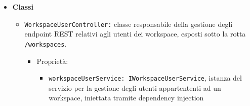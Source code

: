 \documentclass[a4paper, 11pt]{article}
\begin{document}
\begin{itemize}
\begin{itemize}
        \item \texttt{IUserRoleReader:} interfaccia che espone la lettura del ruolo di un utente rispetto a una repository.
        \begin{itemize}
            \item \texttt{getUserRoleForRepository(repositoryId: string, userId: string):\\ WorkspaceRole}
        \end{itemize}
        \item \texttt{IWorkspaceUserRepository:} interfaccia che definisce le operazioni di accesso ai dati per la gestione degli utenti nei workspace.
        \begin{itemize}
            \item \texttt{addUserToWorkspace(user: UserOfWorkspaceEntity, workspaceId: string): void} 
            \item \texttt{removeUserFromWorkspace(workspaceId: string, userId: string): void} 
            \item \texttt{getUsersOfWorkspace(workspaceId: string): UserOfWorkspaceEntity[]} 
            \item \texttt{checkIfUserIsInWorkspace(workspaceId: string, userId: string): boolean} 
            \item \texttt{getUserRoleForRepository(repositoryId: string, userId: string): WorkspaceRole} 
            \item \texttt{getWorkspaceOwner(workspaceId: string): string} 
        \end{itemize}
        
    \end{itemize}
    
    
    \item \textbf{Classi}
    \begin{itemize}

        \item \texttt{WorkspaceUserController:} classe responsabile della gestione degli endpoint REST relativi agli utenti dei workspace, esposti sotto la rotta \texttt{/workspaces}.
        \begin{itemize}
          \item Proprietà:
          \begin{itemize}
            \item \texttt{workspaceUserService: IWorkspaceUserService}, istanza del servizio per la gestione degli utenti appartententi ad un workspace, iniettata tramite dependency injection
          \end{itemize}


\end{itemize}
\end{itemize}
\end{itemize}
\end{document}
